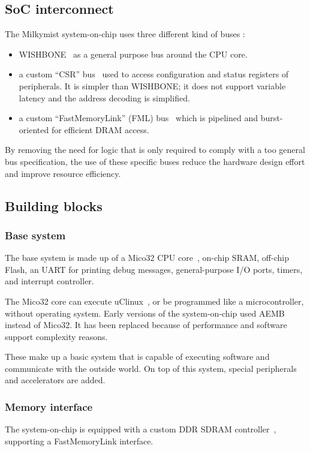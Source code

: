 \documentclass[a4paper,11pt,twocolumn]{paper}
\begin{document}
\subsection{SoC interconnect}
The Milkymist system-on-chip uses three different kind of buses :
\begin{itemize}
\item WISHBONE~\cite{wishbone} as a general purpose bus around the CPU core.
\item a custom ``CSR'' bus~\cite{csr} used to access configuration and status registers of peripherals. It is simpler than WISHBONE; it does not support variable latency and the address decoding is simplified.
\item a custom ``FastMemoryLink'' (FML) bus~\cite{fml} which is pipelined and burst-oriented for efficient DRAM access.
\end{itemize}
By removing the need for logic that is only required to comply with a too general bus specification, the use of these specific buses reduce the hardware design effort and improve resource efficiency.

\subsection{Building blocks}
\subsubsection{Base system}
The base system is made up of a Mico32 CPU core~\cite{mico32}, on-chip SRAM, off-chip Flash, an UART for printing debug messages, general-purpose I/O ports, timers, and interrupt controller.

The Mico32 core can execute uClinux~\cite{micolinux}, or be programmed like a microcontroller, without operating system. Early versions of the system-on-chip used AEMB~\cite{aemb} instead of Mico32. It has been replaced because of performance and software support complexity reasons.

These make up a basic system that is capable of executing software and communicate with the outside world. On top of this system, special peripherals and accelerators are added.

\subsubsection{Memory interface}
The system-on-chip is equipped with a custom DDR SDRAM controller~\cite{hpdmc}, supporting a FastMemoryLink interface.
\end{document}
